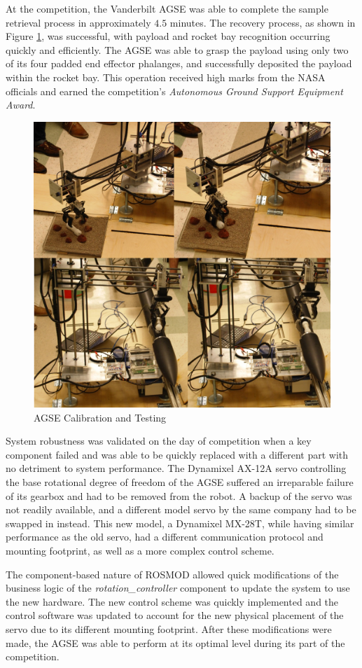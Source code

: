 At the competition, the Vanderbilt AGSE was able to complete the
sample retrieval process in approximately $4.5$ minutes. The recovery
process, as shown in Figure \ref{fig:AGSE_Operation}, was successful,
with payload and rocket bay recognition occurring quickly and
efficiently. The AGSE was able to grasp the payload using only two of
its four padded end effector phalanges, and successfully deposited the
payload within the rocket bay. This operation received high marks from
the NASA officials and earned the competition's \emph{Autonomous
  Ground Support Equipment Award}.

\begin{figure}[t]
  \centering
  \includegraphics[width=0.75\linewidth]{Figures/AGSE_Operation.png}
  \caption{AGSE Calibration and Testing}
  \label{fig:AGSE_Operation}	
\end{figure}

System robustness was validated on the day of competition when a key
component failed and was able to be quickly replaced with a different
part with no detriment to system performance. The Dynamixel AX-12A
servo controlling the base rotational degree of freedom of the AGSE
suffered an irreparable failure of its gearbox and had to be removed
from the robot. A backup of the servo was not readily available, and a
different model servo by the same company had to be swapped in
instead.  This new model, a Dynamixel MX-28T, while having similar
performance as the old servo, had a different communication protocol
and mounting footprint, as well as a more complex control scheme.

The component-based nature of ROSMOD allowed quick modifications of
the business logic of the \emph{rotation\_controller} component to
update the system to use the new hardware.  The new control scheme was
quickly implemented and the control software was updated to account
for the new physical placement of the servo due to its different
mounting footprint. After these modifications were made, the AGSE was
able to perform at its optimal level during its part of the
competition.

